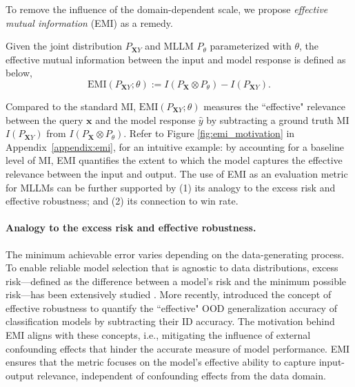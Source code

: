 To remove the influence of the domain-dependent scale, we propose \textit{effective mutual information} (EMI) as a remedy.
\begin{definition}
    Given the joint distribution $P_{\mathbf{X}Y}$ and MLLM $P_{\theta}$ parameterized with $\theta$, the effective mutual information between the input and model response is defined as below,
\begin{equation} \label{eq:emi}
    \text{EMI}(P_{\mathbf{X}Y};\theta):= I(P_{\mathbf{X}}\otimes P_{\theta}) - I(P_{\mathbf{X}Y}).
\end{equation}
\end{definition}
Compared to the standard MI, $\text{EMI}(P_{\mathbf{X}Y}; \theta)$ measures the ``effective" relevance between the query \(\mathbf{x}\) and the model response \(\hat{y}\) by subtracting a ground truth MI \(I(P_{\mathbf{X}Y})\) from $I(P_{\mathbf{X}}\otimes P_{\theta})$. Refer to Figure \ref{fig:emi_motivation} in Appendix~\ref{appendix:emi}, for an intuitive example: by accounting for a baseline level of MI, EMI quantifies the extent to which the model captures the effective relevance between the input and output. The use of EMI as an evaluation metric for MLLMs can be further supported by (1) its analogy to the excess risk and effective robustness;
 and (2) its connection to win rate. 

\paragraph{Analogy to the excess risk and effective robustness.} The minimum achievable error varies depending on the data-generating process. To enable reliable model selection that is agnostic to data distributions, excess risk—defined as the difference between a model's risk and the minimum possible risk—has been extensively studied \cite{castro2008minimax, koltchinskii2010rademacher, mohri2018foundations}. More recently, \citet{taori2020measuring} introduced the concept of effective robustness to quantify the ``effective" OOD generalization accuracy of classification models by subtracting their ID accuracy. The motivation behind EMI aligns with these concepts, i.e., mitigating the influence of external confounding effects that hinder the accurate measure of model performance. EMI ensures that the metric focuses on the model's effective ability to capture input-output relevance, independent of confounding effects from the data domain. 



